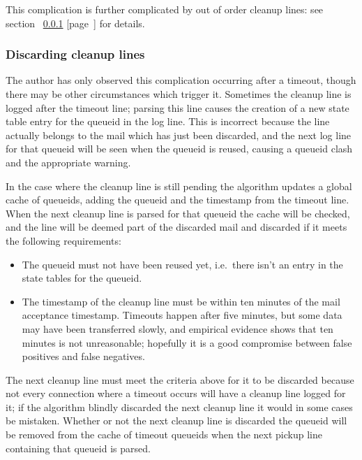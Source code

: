 \documentclass[a4paper,12pt,draft]{article}
\newcommand{\refwithpage}[1]{%
    \empty{}\ref{#1} [page~\pageref{#1}]%
}
\begin{document}
This complication is further complicated by out of order cleanup lines: see
section~\refwithpage{discarding cleanup lines} for details.

\subsubsection{Discarding cleanup lines}

\label{discarding cleanup lines}

The author has only observed this complication occurring after a timeout,
though there may be other circumstances which trigger it.  Sometimes the
cleanup line is logged after the timeout line; parsing this line causes the
creation of a new state table entry for the queueid in the log line.  This
is incorrect because the line actually belongs to the mail which has just
been discarded, and the next log line for that queueid will be seen when
the queueid is reused, causing a queueid clash and the appropriate warning.

In the case where the cleanup line is still pending the algorithm updates a
global cache of queueids, adding the queueid and the timestamp from the
timeout line.  When the next cleanup line is parsed for that queueid the
cache will be checked, and the line will be deemed part of the discarded
mail and discarded if it meets the following requirements:

\begin{itemize}

    \item The queueid must not have been reused yet, i.e.\ there isn't an
        entry in the state tables for the queueid.

    \item The timestamp of the cleanup line must be within ten minutes of
        the mail acceptance timestamp.  Timeouts happen after five minutes,
        but some data may have been transferred slowly, and empirical
        evidence shows that ten minutes is not unreasonable; hopefully it
        is a good compromise between false positives and false negatives.

\end{itemize}

The next cleanup line must meet the criteria above for it to be discarded
because not every connection where a timeout occurs will have a cleanup
line logged for it; if the algorithm blindly discarded the next cleanup
line it would in some cases be mistaken.  Whether or not the next cleanup
line is discarded the queueid will be removed from the cache of timeout
queueids when the next pickup line containing that queueid is parsed.
\end{document}
